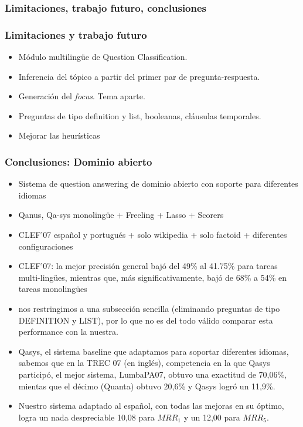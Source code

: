 \subsubsection*{Limitaciones, trabajo futuro, conclusiones}

\begin{frame}
\frametitle{Limitaciones y trabajo futuro}
\begin{itemize}
  \item Módulo multilingüe de Question Classification.
  \item Inferencia del tópico a partir del primer par de pregunta-respuesta.
  \item Generación del \textit{focus}. Tema aparte.
  \item Preguntas de tipo definition y list, booleanas, cláusulas temporales.
  \item Mejorar las heurísticas
\end{itemize}

\end{frame}


\begin{frame}
\frametitle{Conclusiones: Dominio abierto}
  \begin{itemize}
    \item Sistema de question answering de dominio abierto con soporte para diferentes idiomas
    \item Qanus, Qa-sys monolingüe + Freeling + Lasso + Scorers
    \item CLEF'07 español y portugués + solo wikipedia + solo factoid + diferentes configuraciones
    \item CLEF'07: la mejor precisión general bajó del 49\% al 41.75\% para tareas multi-lingües, mientras que, más significativamente, bajó de 68\% a 54\% en tareas monolingües
    \item nos restringimos a una subsección sencilla (eliminando preguntas de tipo DEFINITION y LIST), por lo que no es del todo válido comparar esta performance con la nuestra.
    \item Qasys, el sistema baseline que adaptamos para soportar diferentes idiomas, sabemos que en la TREC 07 (en inglés), competencia en la que Qasys participó, el mejor sistema, LumbaPA07, obtuvo una exactitud de 70,06\%, mientas que el décimo (Quanta) obtuvo 20,6\% y Qasys logró un 11,9\%.
\item Nuestro sistema adaptado al español, con todas las mejoras en su óptimo, logra un nada despreciable 10,08 para $MRR_1$ y un 12,00 para $MRR_5$.
  \end{itemize}

\end{frame}

